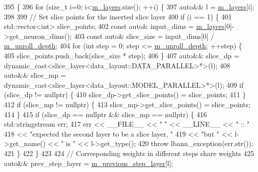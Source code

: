 \begin{DoxyCode}
395                                    \{
396   \textcolor{keywordflow}{for} (\textcolor{keywordtype}{size\_t} i=0; i<\hyperlink{classlbann_1_1model_a0229fc226ec163d1411548446104569d}{m\_layers}.size(); ++i) \{
397     \textcolor{keyword}{auto}&& l = \hyperlink{classlbann_1_1model_a0229fc226ec163d1411548446104569d}{m\_layers}[i];
398 
399     \textcolor{comment}{// Set slice points for the inserted slice layer}
400     \textcolor{keywordflow}{if} (i == 1) \{
401       std::vector<int> slice\_points;
402       \textcolor{keyword}{const} \textcolor{keyword}{auto}& input\_dims = \hyperlink{classlbann_1_1model_a0229fc226ec163d1411548446104569d}{m\_layers}[0]->get\_neuron\_dims();
403       \textcolor{keyword}{const} \textcolor{keyword}{auto}& slice\_size = input\_dims[0] / \hyperlink{classlbann_1_1recurrent__model_a71eb93ebf3411a5c170f6570c93e3cca}{m\_unroll\_depth};
404       \textcolor{keywordflow}{for} (\textcolor{keywordtype}{int} step = 0; step <= \hyperlink{classlbann_1_1recurrent__model_a71eb93ebf3411a5c170f6570c93e3cca}{m\_unroll\_depth}; ++step) \{
405         slice\_points.push\_back(slice\_size * step);
406       \}
407       \textcolor{keyword}{auto}&& slice\_dp = \textcolor{keyword}{dynamic\_cast<}slice\_layer<data\_layout::DATA\_PARALLEL>*\textcolor{keyword}{>}(l);
408       \textcolor{keyword}{auto}&& slice\_mp = \textcolor{keyword}{dynamic\_cast<}slice\_layer<data\_layout::MODEL\_PARALLEL>*\textcolor{keyword}{>}(l);
409       \textcolor{keywordflow}{if} (slice\_dp != \textcolor{keyword}{nullptr}) \{
410         slice\_dp->get\_slice\_points() = slice\_points;
411       \}
412       \textcolor{keywordflow}{if} (slice\_mp != \textcolor{keyword}{nullptr}) \{
413         slice\_mp->get\_slice\_points() = slice\_points;
414       \}
415       \textcolor{keywordflow}{if} (slice\_dp == \textcolor{keyword}{nullptr} && slice\_mp == \textcolor{keyword}{nullptr}) \{
416         std::stringstream err;
417         err << \_\_FILE\_\_ << \textcolor{stringliteral}{" "} << \_\_LINE\_\_ << \textcolor{stringliteral}{" :: "}
418             << \textcolor{stringliteral}{"expected the second layer to be a slice layer, "}
419             << \textcolor{stringliteral}{"but "} << l->get\_name() << \textcolor{stringliteral}{" is "} << l->get\_type();
420         \textcolor{keywordflow}{throw} lbann\_exception(err.str());
421       \}
422     \}
423   
424     \textcolor{comment}{// Corresponding weights in different steps share weights}
425     \textcolor{keyword}{auto}&& prev\_step\_layer = \hyperlink{classlbann_1_1recurrent__model_ac728773d3de0cefb9390231dc176dca4}{m\_previous\_step\_layer}[l];

\end{DoxyCode}
